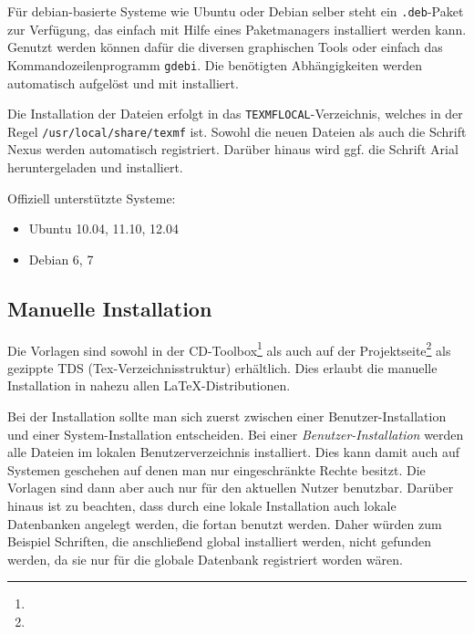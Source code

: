 Für debian-basierte Systeme wie Ubuntu oder Debian selber steht ein
\texttt{.deb}-Paket zur Verfügung, das einfach mit Hilfe eines Paketmanagers
installiert werden kann.
Genutzt werden können dafür die diversen graphischen Tools oder einfach das
Kommandozeilenprogramm \texttt{gdebi}. Die benötigten Abhängigkeiten
werden automatisch aufgelöst und mit installiert.

Die Installation der Dateien erfolgt in das \texttt{TEXMFLOCAL}-Verzeichnis,
welches in der Regel \lstinline{/usr/local/share/texmf} ist.
Sowohl die neuen Dateien als auch die Schrift Nexus werden automatisch registriert.
Darüber hinaus wird ggf. die Schrift Arial heruntergeladen und installiert.

Offiziell unterstützte Systeme:
\begin{itemize}
  \item Ubuntu 10.04, 11.10, 12.04
  \item Debian 6, 7
\end{itemize}


\subsection{Manuelle Installation}


Die Vorlagen sind sowohl in der CD-Toolbox\footnote{\urltoolbox}
als auch auf der Projektseite\footnote{\urltubslatex} als gezippte
TDS (Tex-Verzeichnisstruktur) erhältlich.
Dies erlaubt die manuelle Installation in nahezu allen \LaTeX-Distributionen.

Bei der Installation sollte man sich zuerst zwischen einer Benutzer-Installation
und einer System-Installation entscheiden.
Bei einer \emph{Benutzer-Installation} werden alle Dateien im lokalen Benutzerverzeichnis installiert.
Dies kann damit auch auf Systemen geschehen auf denen man nur
eingeschränkte Rechte besitzt.
Die Vorlagen sind dann aber auch nur für den aktuellen Nutzer benutzbar.
Darüber hinaus ist zu beachten, dass durch eine lokale Installation auch
lokale Datenbanken angelegt werden, die fortan benutzt werden.
Daher würden zum Beispiel Schriften, die anschließend global installiert werden,
nicht gefunden werden, da sie nur für die globale Datenbank registriert worden wären.

